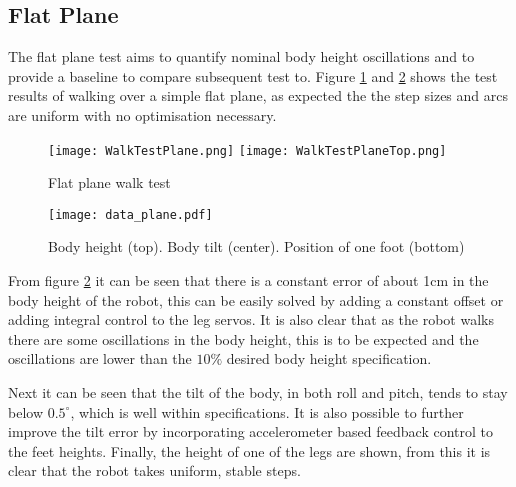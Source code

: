     \subsection{Flat Plane}
    The flat plane test aims to quantify nominal body height oscillations and to provide a baseline to compare subsequent test to.
    Figure \ref{fig:plane_test} and \ref{fig:plane_test_data} shows the test results of walking over a simple flat plane, as expected the the step sizes and arcs are uniform with no optimisation necessary.
    \begin{figure}[h]
        \centering
        \texttt{[image: WalkTestPlane.png]}
        \texttt{[image: WalkTestPlaneTop.png]}
        \caption{Flat plane walk test}
        \label{fig:plane_test}
    \end{figure}
    \begin{figure}[h]
        \centering
        \texttt{[image: data\_plane.pdf]}
        \caption{Body height (top). Body tilt (center). Position of one foot (bottom)}
        \label{fig:plane_test_data}
    \end{figure}
    
    \noindent
    From figure \ref{fig:plane_test_data} it can be seen that there is a constant error of about 1cm in the body height of the robot, this can be easily solved by adding a constant offset or adding integral 
    control to the leg servos. It is also clear that as the robot walks there are some oscillations in the body height, this is to be expected and the oscillations are lower than the \(10\%\) desired body height specification.
        
    Next it can be seen that the tilt of the body, in both roll and pitch, tends to stay below \(0.5^\circ\), which is well within specifications. It is also possible to further improve
    the tilt error by incorporating accelerometer based feedback control to the feet heights. Finally, the height of one of the legs are shown, from this it is clear that the robot takes
    uniform, stable steps.

    \newpage
